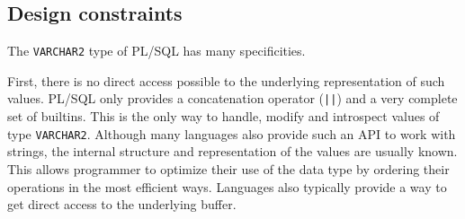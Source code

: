 \documentclass[twoside,11pt,a4paper]{article}
\newcommand{\pls}[1]{\texttt{#1}}
\newcommand{\plstype}[1]{\pls{#1}}
\newcommand{\varchar}{\plstype{VARCHAR2}}
\begin{document}

\subsection{Design constraints}


The \varchar{} type of PL/SQL has many specificities.

First, there is no direct access possible to the underlying representation of such values. PL/SQL only provides a concatenation operator (\pls{||}) and a very complete set of builtins. This is the only way to handle, modify and introspect values of type \varchar{}. Although many languages also provide such an API to work with strings, the internal structure and representation of the values are usually known. This allows programmer to optimize their use of the data type by ordering their operations in the most efficient ways. Languages also typically provide a way to get direct access to the underlying buffer.
\end{document}
